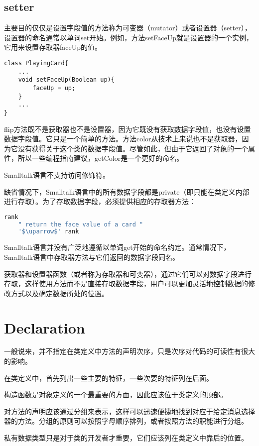 \subsection{setter}


主要目的仅仅是设置字段值的方法称为可变器（mutator）或者设置器（setter），设置器的命名通常以单词set开始。例如，方法setFaceUp就是设置器的一个实例，它用来设置存取器faceUp的值。


\begin{lstlisting}[language={[Sharp]C}]
class PlayingCard{
	...
	void setFaceUp(Boolean up){
		faceUp = up;
	}
	...
}
\end{lstlisting}

flip方法既不是获取器也不是设置器，因为它既没有获取数据字段值，也没有设置数据字段值。它只是一个简单的方法。方法color从技术上来说也不是获取器，因为它没有获得关于这个类的数据字段值。尽管如此，但由于它返回了对象的一个属性，所以一些编程指南建议，getColor是一个更好的命名。


Smalltalk语言不支持访问修饰符。

缺省情况下，Smalltalk语言中的所有数据字段都是private（即只能在类定义内部进行存取）。为了存取数据字段，必须提供相应的存取器方法：


\begin{lstlisting}[language=bash]
rank 
	" return the face value of a card "
	'$\uparrow$' rank
\end{lstlisting}



Smalltalk语言并没有广泛地遵循以单词get开始的命名约定。通常情况下，Smalltalk语言中存取器方法与它们返回的数据字段同名。

获取器和设置器函数（或者称为存取器和可变器），通过它们可以对数据字段进行存取，这样使用方法而不是直接存取数据字段，用户可以更加灵活地控制数据的修改方式以及确定数据所处的位置。


\section{Declaration}


一般说来，并不指定在类定义中方法的声明次序，只是次序对代码的可读性有很大的影响。

\begin{compactitem}
\item 在类定义中，首先列出一些主要的特征，一些次要的特征列在后面。
\item 构造函数是对象定义的一个最重要的方面，因此应该位于类定义的顶部。
\item 对方法的声明应该通过分组来表示，这样可以迅速便捷地找到对应于给定消息选择器的方法。分组的原则可以按照字母顺序排列，或者按照方法的职能进行分组。
\item 私有数据类型只是对于类的开发者才重要，它们应该列在类定义中靠后的位置。
\end{compactitem}




